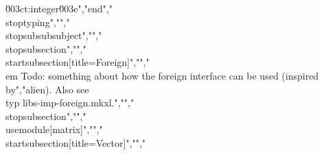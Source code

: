 \u003ct:integer\u003e","end","\\stoptyping","","\\stopsubsubsubject","","\\stopsubsection","","\\startsubsection[title=Foreign]","","{\\em Todo: something about how the foreign interface can be used (inspired by","alien). Also see \\typ {libs-imp-foreign.mkxl}.}","","\\stopsubsection","","\\usemodule[matrix]","","\\startsubsection[title=Vector]","","%